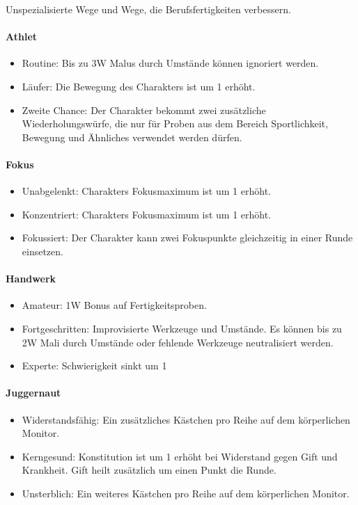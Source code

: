 \documentclass{article}
\begin{document}
Unspezialisierte Wege und Wege, die Berufsfertigkeiten verbessern.

\paragraph{Athlet}

\begin{itemize}
\item Routine: Bis zu 3W Malus durch Umstände können ignoriert werden.
\item Läufer: Die Bewegung des Charakters ist um 1 erhöht.
\item Zweite Chance: Der Charakter bekommt zwei zusätzliche Wiederholungswürfe, die nur für Proben aus dem Bereich Sportlichkeit, Bewegung und Ähnliches verwendet werden dürfen.
\end{itemize}

\paragraph{Fokus}

\begin{itemize}
\item Unabgelenkt: Charakters Fokusmaximum ist um 1 erhöht.
\item Konzentriert: Charakters Fokusmaximum ist um 1 erhöht.
\item Fokussiert: Der Charakter kann zwei Fokuspunkte gleichzeitig in einer Runde einsetzen.
\end{itemize}

\paragraph{Handwerk}

\begin{itemize}
\item Amateur: 1W Bonus auf Fertigkeitsproben.
\item Fortgeschritten: Improvisierte Werkzeuge und Umstände. Es können bis zu 2W Mali durch Umstände oder fehlende Werkzeuge neutralisiert werden.
\item Experte: Schwierigkeit sinkt um 1
\end{itemize}

\paragraph{Juggernaut}

\begin{itemize}
\item Widerstandsfähig: Ein zusätzliches Kästchen pro Reihe auf dem körperlichen Monitor.
\item Kerngesund: Konstitution ist um 1 erhöht bei Widerstand gegen Gift und Krankheit. Gift heilt zusätzlich um einen Punkt die Runde.
\item Unsterblich: Ein weiteres Kästchen pro Reihe auf dem körperlichen Monitor.
\end{itemize}
\end{document}
